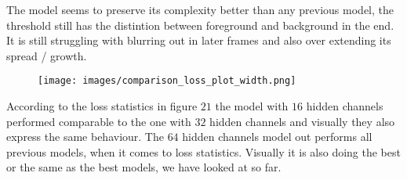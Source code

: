 \documentclass[a4paper,12pt]{article}
\begin{document}
The model seems to preserve its complexity better than any previous model, the threshold still has the distintion between foreground and background in the end. It is still struggling with blurring out in later frames and also over extending its spread / growth.
\begin{figure}[H]
  \centering
  \texttt{[image: images/comparison\_loss\_plot\_width.png]}
  \caption{} %
  \label{fig:n24}
\end{figure}
According to the loss statistics in figure $21$ the model with $16$ hidden channels performed comparable to the one with $32$ hidden channels and visually they also express the same behaviour. The $64$ hidden channels model out performs all previous models, when it comes to loss statistics. Visually it is also doing the best or the same as the best models, we have looked at so far.
\end{document}
